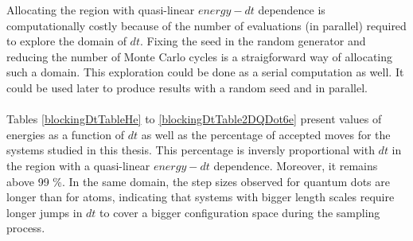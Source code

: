 \noindent
Allocating the region with quasi-linear $energy-dt$ dependence is computationally costly because of the number of evaluations (in parallel) required to explore the domain of $dt$. Fixing the seed in the random generator and reducing the number of Monte Carlo cycles is a straigforward way of allocating such a domain. This exploration could be done as a serial computation as well. It could be used later to produce results with a random seed and in parallel. \\
\\

\noindent
Tables \ref{blockingDtTableHe} to \ref{blockingDtTable2DQDot6e} present values of energies as a function of $dt$ as well as the percentage of accepted moves for the systems studied in this thesis. This percentage is inversly proportional with $dt$ in the region with a quasi-linear $energy-dt$ dependence. Moreover, it remains above 99 \%. In the same domain, the step sizes observed for quantum dots are longer than for atoms, indicating that systems with bigger length scales require longer jumps in $dt$ to cover a bigger configuration space during the sampling process. \\


